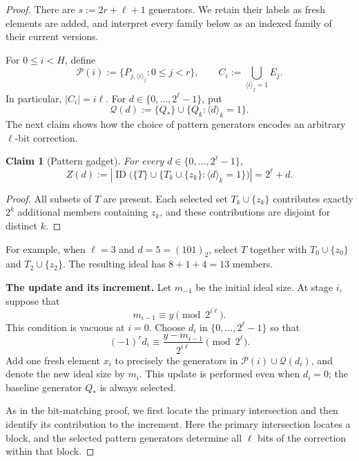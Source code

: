 \documentclass[11pt]{article}
\newtheorem{claim}[claim]{Claim}
\theoremstyle{definition}
\theoremstyle{remark}
\newcommand{\ID}{\operatorname{ID}}
\begin{document}
\begin{proof}
There are $s:=2r+\ell+1$ generators.  We retain their labels as fresh
elements are added, and interpret every family below as an indexed family
of their current versions.

For $0\le i<H$, define
\[
  \mathcal P(i):=\{P_{j,\langle i\rangle_j}:0\le j<r\},
  \qquad
  C_i:=\bigcup_{\langle i\rangle_j=1}E_j.
\]
In particular, $|C_i|=i\ell$.  For
$d\in\{0,\ldots,2^\ell-1\}$, put
\[
  \mathcal Q(d):=\{Q_*\}\cup\{Q_k:\langle d\rangle_k=1\}.
\]
The next claim shows how the choice of pattern generators encodes an
arbitrary $\ell$-bit correction.

\begin{claim}[Pattern gadget]\label{clm:pattern-gadget}
For every $d\in\{0,\ldots,2^\ell-1\}$,
\begin{equation}
  Z(d):=
  \left|\ID\bigl(\{T\}\cup
       \{T_k\cup\{z_k\}:\langle d\rangle_k=1\}\bigr)\right|
  =2^\ell+d.
  \label{eq:pattern-family-Z}
\end{equation}
\end{claim}

\begin{proof}
All subsets of $T$ are present.  Each selected set
$T_k\cup\{z_k\}$ contributes exactly $2^k$ additional members containing
$z_k$, and these contributions are disjoint for distinct $k$.
\end{proof}

For example, when $\ell=3$ and $d=5=(101)_2$, select $T$ together with
$T_0\cup\{z_0\}$ and $T_2\cup\{z_2\}$.  The resulting ideal has
$8+1+4=13$ members.

\smallskip
\noindent\textbf{The update and its increment.}
Let $m_{-1}$ be the initial ideal size.  At stage $i$, suppose that
\[
  m_{i-1}\equiv y\pmod{2^{i\ell}}.
\]
This condition is vacuous at $i=0$.  Choose $d_i$ in
$\{0,\ldots,2^\ell-1\}$ so that
\begin{equation}
  (-1)^r d_i\equiv
  \frac{y-m_{i-1}}{2^{i\ell}}\pmod{2^\ell}.
  \label{eq:choose-pattern}
\end{equation}
Add one fresh element $x_i$ to precisely the generators in
$\mathcal P(i)\cup\mathcal Q(d_i)$, and denote the new ideal size by
$m_i$.  This update is performed even when $d_i=0$; the baseline
generator $Q_*$ is always selected.

As in the bit-matching proof, we first locate the primary intersection
and then identify its contribution to the increment.  Here the primary
intersection locates a block, and the selected pattern generators determine
all $\ell$ bits of the correction within that block.


\end{proof}
\end{document}
